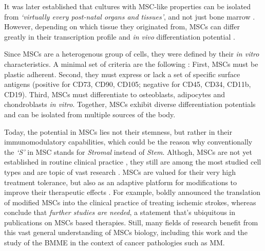 It was later established that cultures with MSC-like properties can be isolated
from \textit{`virtually every post-natal organs and tissues'}, and not just bone
marrow \cite{dasilvameirellesMesenchymalStemCells2006}. However, depending on
which tissue they originated from, \acp{MSC} can differ greatly in their
transcription profile and \textit{in vivo} differentiation potential
\cite{jansenFunctionalDifferencesMesenchymal2010,
    sacchettiNoIdenticalMesenchymal2016}.

Since \acp{MSC} are a heterogenous group of cells, they were defined by their
\textit{in vitro} characteristics. A minimal set of criteria are the following
\cite{dominiciMinimalCriteriaDefining2006}: First, \acp{MSC} must be plastic
adherent. Second, they must express or lack a set of specific surface antigens
(positive for CD73, CD90, CD105; negative for CD45, CD34, CD11b, CD19). Third,
\acp{MSC} must differentiate to osteoblasts, adipocytes and chondroblasts
\textit{in vitro}. Together, \acp{MSC} exhibit diverse differentiation
potentials and can be isolated from multiple sources of the body.

Today, the potential in \acp{MSC} lies not their stemness, but rather in their
immunomodulatory capabilities, which could be the reason why conventionally the
\emph{`S'} in \ac{MSC} stands for \emph{Stromal} instead of \emph{Stem}.
Althogh, \acp{MSC} are not yet established in routine clinical practice
, they still are among the most studied cell types and are topic
of vast research \cite{abdelrazikMesenchymalStemCells2023}. \acp{MSC} are valued
for their very high treatment tolerance, but also as an adaptive platform for
modifications to improve their therapeutic effects
\cite{dsouzaMesenchymalStemStromal2015}. For example,
\citet{chenTreatmentIschemicStroke2022} boldly announced the translation of
modified \acp{MSC} into the clinical practice of treating ischemic strokes,
whereas \citet{monivasgallegoMesenchymalStemCell2024} conclude that
\emph{further studies are needed}, a statement that's ubiquitous in publications
on \acp{MSC} based therapies. Still, many fields of research
benefit from this vast general understanding of \acp{MSC} biology, including
this work and the study of the \ac{BMME} in the context of cancer pathologies
such as \ac{MM}.






